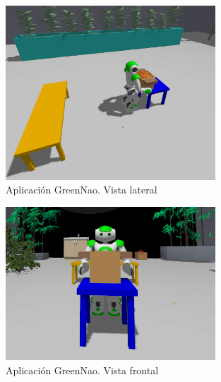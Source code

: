 \begin{figure}[H]
  \centering
  \includegraphics[width=0.7\textwidth]{figures/cap_4/app_1.png}
  \caption{Aplicación GreenNao. Vista lateral}
  \label{fig:aplicacion_1}
\end{figure}

\begin{figure}[H]
  \centering
  \includegraphics[width=0.7\textwidth]{figures/cap_4/app_2.png}
  \caption{Aplicación GreenNao. Vista frontal}
  \label{fig:aplicacion_2}
\end{figure}